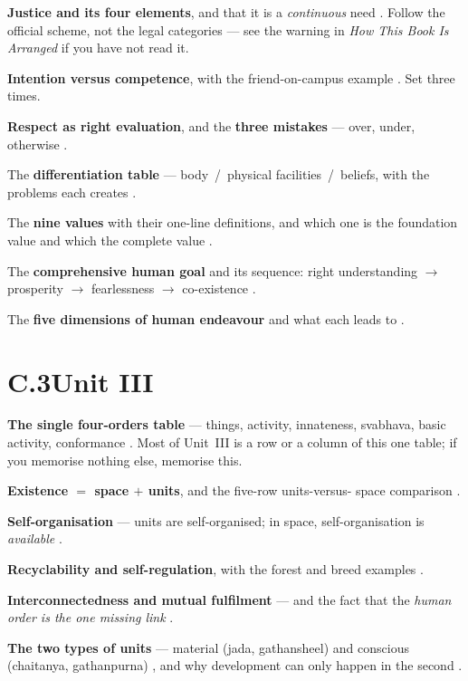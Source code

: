\begin{abul}
\item \textbf{Justice and its four elements}, and that it is a
      \emph{continuous} need . Follow the official scheme, not the
      legal categories --- see the warning in \emph{How This Book Is
      Arranged} if you have not read it.
\item \textbf{Intention versus competence}, with the friend-on-campus example
      . Set three times.
\item \textbf{Respect as right evaluation}, and the \textbf{three mistakes}
      --- over, under, otherwise .
\item The \textbf{differentiation table} --- body \,/\, physical facilities
      \,/\, beliefs, with the problems each creates .
\item The \textbf{nine values} with their one-line definitions, and which one
      is the foundation value and which the complete value .
\item The \textbf{comprehensive human goal} and its sequence: right
      understanding $\rightarrow$ prosperity $\rightarrow$ fearlessness
      $\rightarrow$ co-existence .
\item The \textbf{five dimensions of human endeavour} and what each leads to
      .
\end{abul}

\section*{C.3\enspace Unit III}

\begin{abul}
\item \textbf{The single four-orders table} --- things, activity, innateness,
      svabhava, basic activity, conformance . Most of Unit~III is a
      row or a column of this one table; if you memorise nothing else,
      memorise this.
\item \textbf{Existence $=$ space $+$ units}, and the five-row units-versus-
      space comparison .
\item \textbf{Self-organisation} --- units are self-organised; in space,
      self-organisation is \emph{available} .
\item \textbf{Recyclability and self-regulation}, with the forest and breed
      examples .
\item \textbf{Interconnectedness and mutual fulfilment} --- and the fact that
      the \emph{human order is the one missing link} .
\item \textbf{The two types of units} --- material (jada, gathansheel) and
      conscious (chaitanya, gathanpurna) , and why development can
      only happen in the second .
\end{abul}

